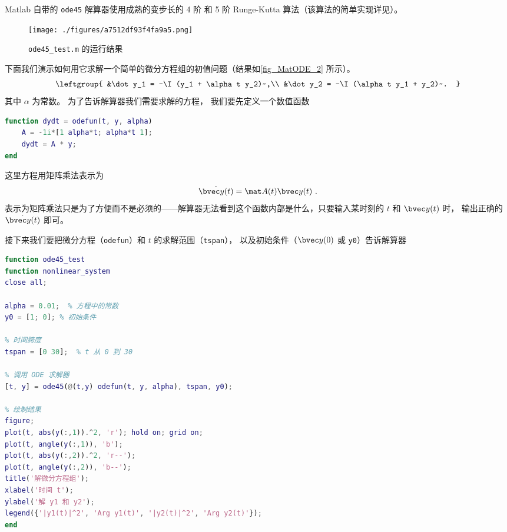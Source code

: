 

Matlab 自带的 \verb`ode45` 解算器使用成熟的变步长的 4 阶 和 5 阶 Runge-Kutta 算法（该算法的简单实现详见）。

\begin{figure}[ht]
\centering
\texttt{[image: ./figures/a7512df93f4fa9a5.png]}
\caption{\verb|ode45_test.m| 的运行结果} \label{fig_MatODE_2}
\end{figure}

下面我们演示如何用它求解一个简单的微分方程组的初值问题（结果如\autoref{fig_MatODE_2} 所示）。
\begin{equation}
\leftgroup{
&\dot y_1 = -\I (y_1 + \alpha t y_2)~,\\
&\dot y_2 = -\I (\alpha t y_1 + y_2)~.
}\end{equation}
其中 $\alpha$ 为常数。 为了告诉解算器我们需要求解的方程， 我们要先定义一个数值函数
\begin{lstlisting}[language=matlab,caption=odefun.m]
function dydt = odefun(t, y, alpha)
    A = -1i*[1 alpha*t; alpha*t 1];
    dydt = A * y;
end
\end{lstlisting}
这里方程用矩阵乘法表示为
\begin{equation}
\dot{\bvec y(t)} = \mat A(t) \bvec y(t)~.
\end{equation}
表示为矩阵乘法只是为了方便而不是必须的——解算器无法看到这个函数内部是什么，只要输入某时刻的 $t$ 和 $\bvec y(t)$ 时， 输出正确的 $\dot{\bvec y(t)}$ 即可。

接下来我们要把微分方程（\verb`odefun`）和 $t$ 的求解范围（\verb`tspan`）， 以及初始条件（$\bvec y(0)$ 或 \verb`y0`）告诉解算器
\begin{lstlisting}[language=matlab,caption=ode45\_test.m]
function ode45_test
function nonlinear_system
close all;

alpha = 0.01;  % 方程中的常数
y0 = [1; 0]; % 初始条件

% 时间跨度
tspan = [0 30];  % t 从 0 到 30

% 调用 ODE 求解器
[t, y] = ode45(@(t,y) odefun(t, y, alpha), tspan, y0);

% 绘制结果
figure;
plot(t, abs(y(:,1)).^2, 'r'); hold on; grid on;
plot(t, angle(y(:,1)), 'b');
plot(t, abs(y(:,2)).^2, 'r--');
plot(t, angle(y(:,2)), 'b--');
title('解微分方程组');
xlabel('时间 t');
ylabel('解 y1 和 y2');
legend({'|y1(t)|^2', 'Arg y1(t)', '|y2(t)|^2', 'Arg y2(t)'});
end
\end{lstlisting}

